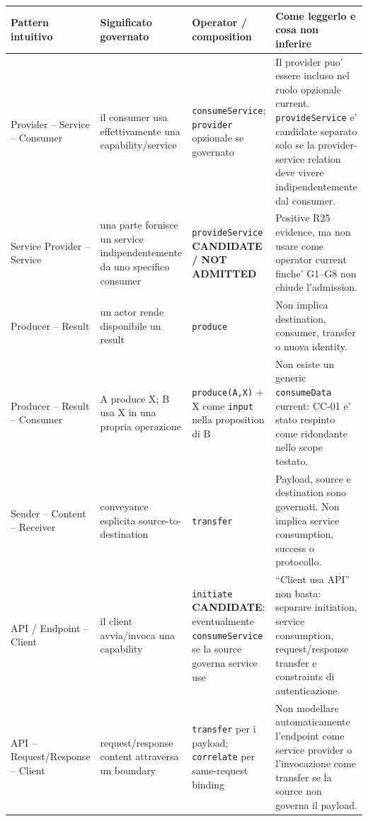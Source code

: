 \documentclass[11pt,a4paper]{article}
\begin{document}
\begin{landscape}
\small
\begin{longtable}{L{38mm}L{44mm}L{55mm}L{92mm}}
\toprule
\textbf{Pattern intuitivo} & \textbf{Significato governato} & \textbf{Operator / composition} & \textbf{Come leggerlo e cosa non inferire} \\
\midrule\endhead
Provider -- Service -- Consumer & il consumer usa effettivamente una capability/service & \texttt{consumeService}; \texttt{provider} opzionale se governato & Il provider puo' essere incluso nel ruolo opzionale current. \texttt{provideService} e' candidate separato solo se la provider-service relation deve vivere indipendentemente dal consumer. \\

Service Provider -- Service & una parte fornisce un service indipendentemente da uno specifico consumer & \texttt{provideService} \textbf{CANDIDATE / NOT ADMITTED} & Positive R25 evidence, ma non usare come operator current finche' G1--G8 non chiude l'admission. \\

Producer -- Result & un actor rende disponibile un result & \texttt{produce} & Non implica destination, consumer, transfer o nuova identity. \\

Producer -- Result -- Consumer & A produce X; B usa X in una propria operazione & \texttt{produce(A,X)} + X come \texttt{input} nella proposition di B & Non esiste un generic \texttt{consumeData} current: CC-01 e' stato respinto come ridondante nello scope testato. \\

Sender -- Content -- Receiver & conveyance esplicita source-to-destination & \texttt{transfer} & Payload, source e destination sono governati. Non implica service consumption, success o protocollo. \\

API / Endpoint -- Client & il client avvia/invoca una capability & \texttt{initiate} \textbf{CANDIDATE}; eventualmente \texttt{consumeService} se la source governa service use & ``Client usa API'' non basta: separare initiation, service consumption, request/response transfer e constraints di autenticazione. \\

API -- Request/Response -- Client & request/response content attraversa un boundary & \texttt{transfer} per i payload; \texttt{correlate} per same-request binding & Non modellare automaticamente l'endpoint come service provider o l'invocazione come transfer se la source non governa il payload. \\


\end{longtable}
\end{landscape}
\end{document}
